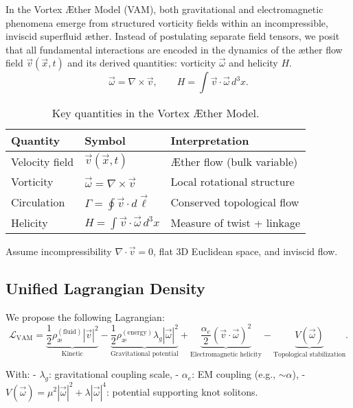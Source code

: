 In the Vortex \AE{}ther Model (VAM), both gravitational and electromagnetic phenomena emerge from structured vorticity fields within an incompressible, inviscid superfluid \ae{}ther. Instead of postulating separate field tensors, we posit that all fundamental interactions are encoded in the dynamics of the \ae{}ther flow field $\vec{v}(\vec{x}, t)$ and its derived quantities: vorticity $\vec{\omega}$ and helicity $H$.
\[
\vec{\omega} = \nabla \times \vec{v}, \qquad H = \int \vec{v} \cdot \vec{\omega} \, d^3x.
\]
\begin{table}[H]
\centering
\begin{tabular}{|l|l|l|}
\hline
\textbf{Quantity} & \textbf{Symbol} & \textbf{Interpretation} \\
\hline
Velocity field & $\vec{v}(\vec{x}, t)$ & Æther flow (bulk variable) \\
Vorticity & $\vec{\omega} = \nabla \times \vec{v}$ & Local rotational structure \\
Circulation & $\Gamma = \oint \vec{v} \cdot d\vec{\ell}$ & Conserved topological flow \\
Helicity & $H = \int \vec{v} \cdot \vec{\omega} \, d^3x$ & Measure of twist + linkage \\
\hline
\end{tabular}
\caption{Key quantities in the Vortex Æther Model.}
\end{table}

Assume incompressibility \( \nabla \cdot \vec{v} = 0 \), flat 3D Euclidean space, and inviscid flow.

\subsection{Unified Lagrangian Density}

We propose the following Lagrangian:
\begin{equation}
\mathcal{L}_{\text{VAM}} =
\underbrace{\frac{1}{2} \rho_\text{\ae}^{(\text{fluid})} |\vec{v}|^2}_{\text{Kinetic}}
- \underbrace{\frac{1}{2} \rho_\text{\ae}^{(\text{energy})} \lambda_g |\vec{\omega}|^2}_{\text{Gravitational potential}}
+ \underbrace{\frac{\alpha_e}{2} (\vec{v} \cdot \vec{\omega})^2}_{\text{Electromagnetic helicity}}
- \underbrace{V(\vec{\omega})}_{\text{Topological stabilization}}.
\end{equation}

With:
- \( \lambda_g \): gravitational coupling scale,
- \( \alpha_e \): EM coupling (e.g., \( \sim \alpha \)),
- \( V(\vec{\omega}) = \mu^2 |\vec{\omega}|^2 + \lambda |\vec{\omega}|^4 \): potential supporting knot solitons.

